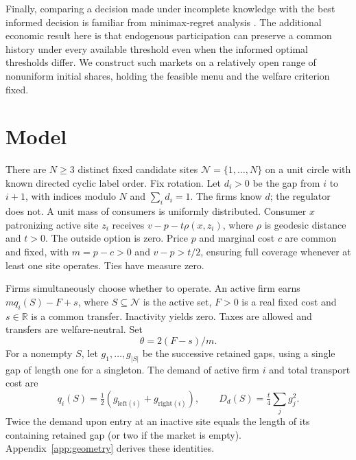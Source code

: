 \documentclass[11pt]{article}
\newcommand{\All}{\mathcal N}
\begin{document}
Finally, comparing a decision made under incomplete knowledge with the best informed decision is familiar from minimax-regret analysis \citep{manski2004}. The additional economic result here is that endogenous participation can preserve a common history under every available threshold even when the informed optimal thresholds differ. We construct such markets on a relatively open range of nonuniform initial shares, holding the feasible menu and the welfare criterion fixed.

\section{Model}
\label{sec:model}
There are $N\geq3$ distinct fixed candidate sites $\All=\{1,\ldots,N\}$ on a unit circle with known directed cyclic label order. Fix rotation. Let $d_i>0$ be the gap from $i$ to $i+1$, with indices modulo $N$ and $\sum_i d_i=1$. The firms know $d$; the regulator does not. A unit mass of consumers is uniformly distributed. Consumer $x$ patronizing active site $z_i$ receives $v-p-t\rho(x,z_i)$, where $\rho$ is geodesic distance and $t>0$. The outside option is zero. Price $p$ and marginal cost $c$ are common and fixed, with $m=p-c>0$ and $v-p>t/2$, ensuring full coverage whenever at least one site operates. Ties have measure zero.

Firms simultaneously choose whether to operate. An active firm earns $mq_i(S)-F+s$, where $S\subseteq\All$ is the active set, $F>0$ is a real fixed cost and $s\in\mathbb R$ is a common transfer. Inactivity yields zero. Taxes are allowed and transfers are welfare-neutral. Set
\begin{equation}\label{eq:theta}
\theta=2(F-s)/m.
\end{equation}
For a nonempty $S$, let $g_1,\ldots,g_{|S|}$ be the successive retained gaps, using a single gap of length one for a singleton. The demand of active firm $i$ and total transport cost are
\begin{equation}\label{eq:allocation}
q_i(S)=\tfrac12(g_{\mathrm{left}(i)}+g_{\mathrm{right}(i)}),\qquad D_d(S)=\tfrac t4\sum_j g_j^2.
\end{equation}
Twice the demand upon entry at an inactive site equals the length of its containing retained gap (or two if the market is empty). Appendix~\ref{app:geometry} derives these identities.
\end{document}
